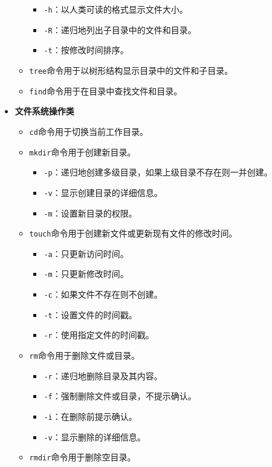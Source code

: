 \documentclass[../main.tex]{subfiles}
\begin{document}
\begin{itemize}
\begin{itemize}
\begin{itemize}
      \item \texttt{-h}：以人类可读的格式显示文件大小。
      \item \texttt{-R}：递归地列出子目录中的文件和目录。
      \item \texttt{-t}：按修改时间排序。
    \end{itemize}
    \item \texttt{tree}命令用于以树形结构显示目录中的文件和子目录。
    \item \texttt{find}命令用于在目录中查找文件和目录。
  \end{itemize}
  \item \textbf{文件系统操作类}
  \begin{itemize}
    \item \texttt{cd}命令用于切换当前工作目录。
    \item \texttt{mkdir}命令用于创建新目录。
    \begin{itemize}
      \item \texttt{-p}：递归地创建多级目录，如果上级目录不存在则一并创建。
      \item \texttt{-v}：显示创建目录的详细信息。
      \item \texttt{-m}：设置新目录的权限。
    \end{itemize}
    \item \texttt{touch}命令用于创建新文件或更新现有文件的修改时间。
    \begin{itemize}
      \item \texttt{-a}：只更新访问时间。
      \item \texttt{-m}：只更新修改时间。
      \item \texttt{-c}：如果文件不存在则不创建。
      \item \texttt{-t}：设置文件的时间戳。
      \item \texttt{-r}：使用指定文件的时间戳。
    \end{itemize}
    \item \texttt{rm}命令用于删除文件或目录。
    \begin{itemize}
      \item \texttt{-r}：递归地删除目录及其内容。
      \item \texttt{-f}：强制删除文件或目录，不提示确认。
      \item \texttt{-i}：在删除前提示确认。
      \item \texttt{-v}：显示删除的详细信息。
    \end{itemize}
    \item \texttt{rmdir}命令用于删除空目录。

\end{itemize}
\end{itemize}
\end{document}
